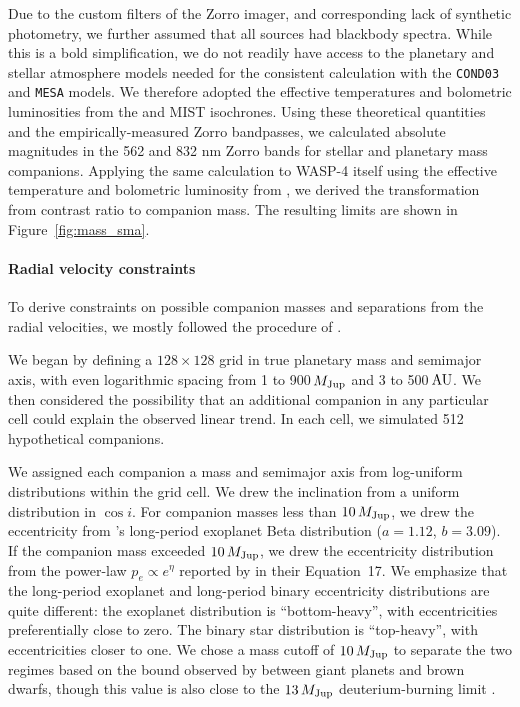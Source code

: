 \documentclass[12pt,twocolumn,tighten]{aastex62}
\begin{document}
Due to the custom filters of the Zorro imager, and corresponding lack
of synthetic photometry, we further assumed that all sources had
blackbody spectra. While this is a bold simplification, we do not
readily have access to the planetary and stellar atmosphere models
needed for the consistent calculation with the \texttt{COND03} and
\texttt{MESA} models.  We therefore adopted the effective temperatures
and bolometric luminosities from the \citet{baraffe_evolutionary_2003}
and MIST isochrones.  Using these theoretical quantities and the
empirically-measured Zorro bandpasses, we calculated absolute
magnitudes in the 562 and 832 nm Zorro bands for stellar and planetary
mass companions.  Applying the same calculation to WASP-4 itself using
the effective temperature and bolometric luminosity from
, we derived the transformation from
contrast ratio to companion mass.  The resulting limits are shown in
Figure~\ref{fig:mass_sma}.


\paragraph{Radial velocity constraints}

To derive constraints on possible companion masses and separations
from the radial velocities, we mostly followed the procedure of
\citet{bryan_excess_2019}. 

We began by defining a $128\times128$ grid in true planetary mass and
semimajor axis, with even logarithmic spacing from 1 to 900$\,$$M_{\rm
Jup}$ and 3 to 500$\,$${\rm AU}$.  We then considered the possibility
that an additional companion in any particular cell could explain the
observed linear trend.  In each cell, we simulated 512 hypothetical
companions.

We assigned each companion a mass and semimajor axis from log-uniform
distributions within the grid cell. We drew the inclination from a
uniform distribution in $\cos i$.  For companion masses less than
$10\,M_{\rm Jup}$, we drew the eccentricity from
\citet{kipping_beta_2013}'s long-period exoplanet Beta distribution
($a=1.12$, $b=3.09$).  If the companion mass exceeded $10\,M_{\rm
Jup}$, we drew the eccentricity distribution from the power-law $p_e
\propto e^\eta$ reported by \citet{moe_mind_2017} in their
Equation~17.  We emphasize that the long-period exoplanet and
long-period binary eccentricity distributions are quite different: the
exoplanet distribution is ``bottom-heavy'', with eccentricities
preferentially close to zero. The binary star distribution is
``top-heavy'', with eccentricities closer to one.  We chose a mass
cutoff of $10\,M_{\rm Jup}$ to separate the two regimes based on the
bound observed by \citet{schlaufman_evidence_2018} between giant
planets and brown dwarfs, though this value is also close to the
$13\,M_{\rm Jup}$ deuterium-burning limit \citep[{\it
e.g.},][]{burrows_nongray_1997}.
\end{document}
